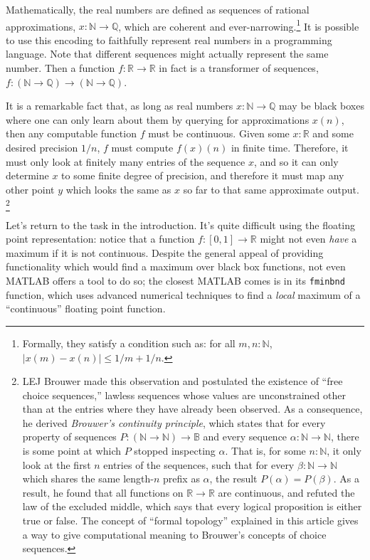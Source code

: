 \documentclass{article}
\newcommand{\nat}{\mathbb{N}}
\newcommand{\rat}{\mathbb{Q}}
\newcommand{\R}{\mathbb{R}}
\newcommand{\bool}{\mathbb{B}}
\begin{document}
Mathematically, the real numbers are defined as sequences of rational approximations, $x : \nat \to \rat$, which are coherent and ever-narrowing.\footnote{Formally, they satisfy a condition such as: for all $m, n : \nat$, $|x(m) - x(n)| \le 1/m + 1/n$.} It is possible to use this encoding to faithfully represent real numbers in a programming language. Note that different sequences might actually represent the same number. Then a function $f : \R \to \R$ in fact is a transformer of sequences, $f : (\nat \to \rat) \to (\nat \to \rat)$.

It is a remarkable fact that, as long as real numbers $x : \nat \to \rat$ may be black boxes where one can only learn about them by querying for approximations $x(n)$, then any computable function $f$ must be continuous. Given some $x : \R$ and some desired precision $1/n$, $f$ must compute $f(x)(n)$ in finite time. Therefore, it must only look at finitely many entries of the sequence $x$, and so it can only determine $x$ to some finite degree of precision, and therefore it must map any other point $y$ which looks the same as $x$ so far to that same approximate output.
\footnote{LEJ Brouwer made this observation and postulated the existence of ``free choice sequences,'' lawless sequences whose values are unconstrained other than at the entries where they have already been observed. As a consequence, he derived \emph{Brouwer's continuity principle}, which states that for every property of sequences $P : (\nat \to \nat) \to \bool$ and every sequence $\alpha : \nat \to \nat$, there is some point at which $P$ stopped inspecting $\alpha$. That is, for some $n : \nat$, it only look at the first $n$ entries of the sequences, such that for every $\beta : \nat \to \nat$ which shares the same length-$n$ prefix as $\alpha$, the result $P(\alpha) = P(\beta)$. As a result, he found that all functions on $\R \to \R$ are continuous, and refuted the law of the excluded middle, which says that every logical proposition is either true or false. The concept of ``formal topology'' explained in this article gives a way to give computational meaning to Brouwer's concepts of choice sequences.}

Let's return to the task in the introduction. It's quite difficult using the floating point representation: notice that a function $f : [0,1] \to \R$ might not even \emph{have} a maximum if it is not continuous. Despite the general appeal of providing functionality which would find a maximum over black box functions, not even MATLAB offers a tool to do so; the closest MATLAB comes is in its \texttt{fminbnd} function, which uses advanced numerical techniques to find a \emph{local} maximum of a ``continuous'' floating point function.
\end{document}

